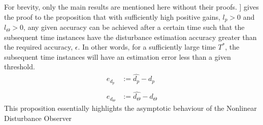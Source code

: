\documentclass[letterpaper%
, twoside%
, 12pt%
,memoire%
, english%
,creativecommons,hyperref%
]{thETS}
\begin{document}
For brevity, only the main results are mentioned here without their proofs. \citep{RN114}] gives the proof to the proposition that with sufficiently high positive gains, $l_p>0$ and $l_\Theta>0$, any given accuracy can be achieved after a certain time such that the subsequent time instances have the disturbance estimation accuracy greater than the required accuracy, $\epsilon$. In other words, for a sufficiently large time $T^*$, the subsequent time instances will have an estimation error less than a given threshold.
\begin{align} \label{eqn:NDO3}
e_{d_p} &:=\hat{d_p} - d_p \\ \nonumber\\
e_{d_\Theta} &:=\hat{d_\Theta}-d_\Theta
\end{align}
This proposition essentially highlights the asymptotic behaviour of the Nonlinear Disturbance Observer
\end{document}
